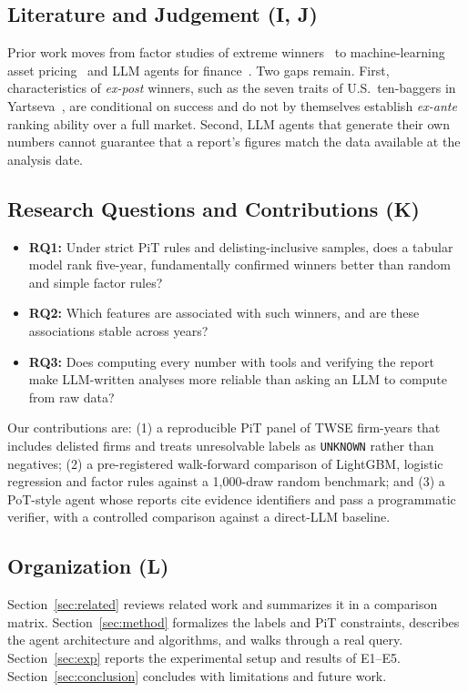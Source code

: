 \documentclass[conference]{IEEEtran}
\begin{document}
\subsection{Literature and Judgement (I, J)}
Prior work moves from factor studies of extreme winners~\cite{b10,b12} to machine-learning asset pricing~\cite{b9,b14} and LLM agents for finance~\cite{b13}. Two gaps remain. First, characteristics of \emph{ex-post} winners, such as the seven traits of U.S.\ ten-baggers in Yartseva~\cite{b10}, are conditional on success and do not by themselves establish \emph{ex-ante} ranking ability over a full market. Second, LLM agents that generate their own numbers cannot guarantee that a report's figures match the data available at the analysis date.

\subsection{Research Questions and Contributions (K)}
\begin{itemize}
\item \textbf{RQ1:} Under strict PiT rules and delisting-inclusive samples, does a tabular model rank five-year, fundamentally confirmed winners better than random and simple factor rules?
\item \textbf{RQ2:} Which features are associated with such winners, and are these associations stable across years?
\item \textbf{RQ3:} Does computing every number with tools and verifying the report make LLM-written analyses more reliable than asking an LLM to compute from raw data?
\end{itemize}
Our contributions are: (1) a reproducible PiT panel of TWSE firm-years that includes delisted firms and treats unresolvable labels as \texttt{UNKNOWN} rather than negatives; (2) a pre-registered walk-forward comparison of LightGBM, logistic regression and factor rules against a 1,000-draw random benchmark; and (3) a PoT-style agent whose reports cite evidence identifiers and pass a programmatic verifier, with a controlled comparison against a direct-LLM baseline.

\subsection{Organization (L)}
Section~\ref{sec:related} reviews related work and summarizes it in a comparison matrix. Section~\ref{sec:method} formalizes the labels and PiT constraints, describes the agent architecture and algorithms, and walks through a real query. Section~\ref{sec:exp} reports the experimental setup and results of E1--E5. Section~\ref{sec:conclusion} concludes with limitations and future work.
\end{document}
